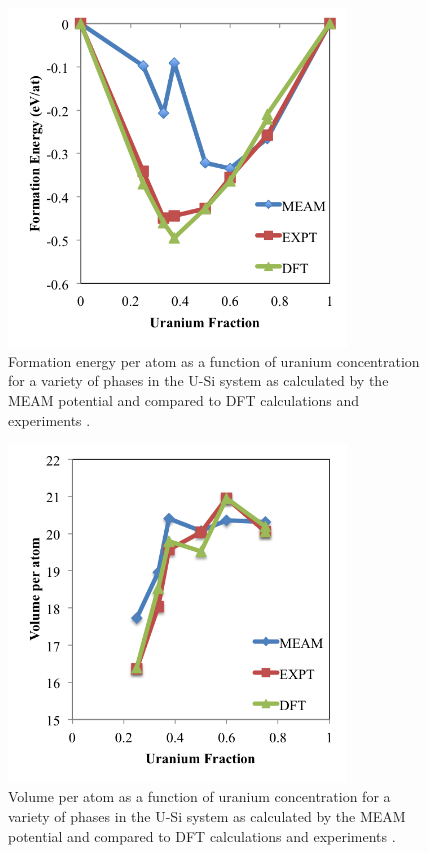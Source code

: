 \documentclass[review]{elsarticle}
\begin{document}
\begin{figure}[hbt]
	\centering
	\includegraphics[width=0.8\textwidth]{EvsC_KK1a.png}
    \caption{Formation energy per atom as a function of uranium concentration for a variety of phases in the U-Si system as calculated by the MEAM potential and compared to DFT calculations \cite{noordhoek2016} and experiments \cite{berche2009}.}\label{fig:eform3}
\end{figure}

 \begin{figure}[hbt]
	\centering
	\includegraphics[width=0.8\textwidth]{VvsC_KK1a.png}
    \caption{Volume per atom as a function of uranium concentration for a variety of phases in the U-Si system as calculated by the MEAM potential and compared to DFT calculations \cite{noordhoek2016} and experiments \cite{berche2009}.}\label{fig:vol3}
\end{figure}
\end{document}
